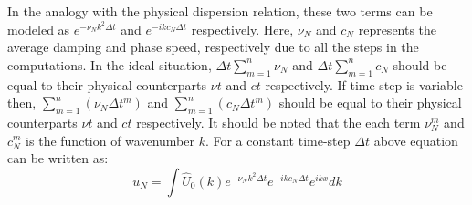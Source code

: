 \documentclass[fleqn]{article}
\begin{document}
In the analogy with the physical dispersion relation, these two terms can be modeled as $e^{-\nu_N k^2 \Delta t}$ and $e^{-i k c_N \Delta t}$ respectively. Here, $\nu_N$ and $c_N$ represents the average damping and phase speed, respectively due to all the steps in the computations. In the ideal situation, $\Delta t \sum\limits_{m=1}^{n} \nu_N $ and $\Delta t \sum\limits_{m=1}^{n} c_N$ should be equal to their physical counterparts $\nu t$ and $c t$ respectively. If time-step is variable then, $\sum\limits_{m=1}^{n}(\nu_N \Delta t^m)$ and $\sum\limits_{m=1}^{n}(c_N \Delta t ^m)$ should be equal to their physical counterparts $\nu t$ and $c t$ respectively.  It should be noted that the each term $\nu_N^m$ and $c_N^m$ is the function of wavenumber $k$. For a constant time-step $\Delta t$ above equation can be written as: 
\begin{equation}
u_N = \int \hat{U}_0(k) e^{-\nu_N k^2 \Delta t} e^{-i k c_N \Delta t} e^{i k x} dk
\label{num_sol}
\end{equation}
\end{document}
